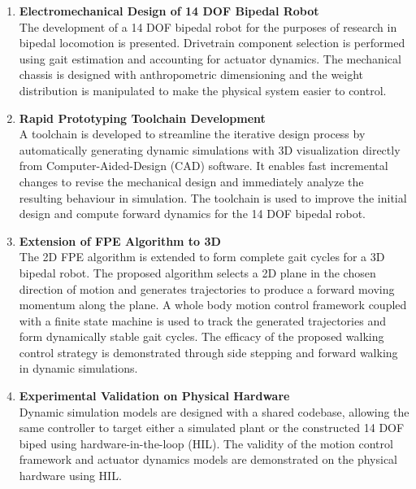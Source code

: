 \begin{enumerate}
	\item \textbf{Electromechanical Design of 14 DOF Bipedal Robot} \\ 
	The development of a 14 DOF bipedal robot for the purposes of research in bipedal locomotion is presented. Drivetrain component selection is performed using gait estimation and accounting for actuator dynamics. The mechanical chassis is designed with anthropometric dimensioning and the weight distribution is manipulated to make the physical system easier to control.  \\

	\item \textbf{Rapid Prototyping Toolchain Development} \\ 
	A toolchain is developed to streamline the iterative design process by automatically generating dynamic simulations with 3D visualization directly from Computer-Aided-Design (CAD) software. It enables fast incremental changes to revise the mechanical design and immediately analyze the resulting behaviour in simulation. The toolchain is used to improve the initial design and compute forward dynamics for the 14 DOF bipedal robot. \\

	\item \textbf{Extension of FPE Algorithm to 3D} \\ 
	The 2D FPE algorithm is extended to form complete gait cycles for a 3D bipedal robot. The proposed algorithm selects a 2D plane in the chosen direction of motion and generates trajectories to produce a forward moving momentum along the plane. A whole body motion control framework coupled with a finite state machine is used to track the generated trajectories and form dynamically stable gait cycles. The efficacy of the proposed walking control strategy is demonstrated through side stepping and forward walking in dynamic simulations. \\

	\item \textbf{Experimental Validation on Physical Hardware} \\ 
	Dynamic simulation models are designed with a shared codebase, allowing the same controller to target either a simulated plant or the constructed 14 DOF biped using hardware-in-the-loop (HIL). The validity of the motion control framework and actuator dynamics models are demonstrated on the physical hardware using HIL. \\

\end{enumerate}

